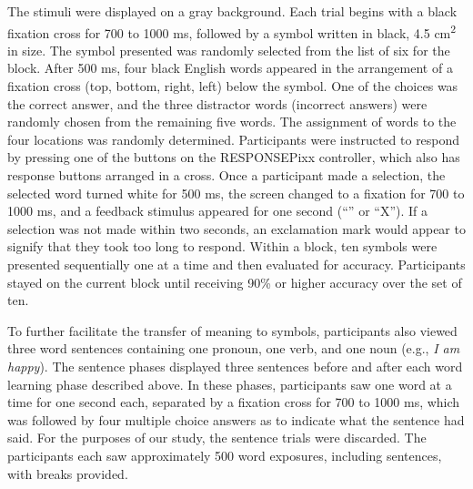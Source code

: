 The stimuli were displayed on a gray background.  Each trial begins with a black fixation cross for 700 to 1000 ms, followed by a symbol written in black, 4.5 cm\textsuperscript{2} in size. The symbol presented was randomly selected from the list of six for the block. After 500 ms, four black English words appeared in the arrangement of a fixation cross (top, bottom, right, left) below the symbol. One of the choices was the correct answer, and the three distractor words (incorrect answers) were randomly chosen from the remaining five words. The assignment of words to the four locations was randomly determined. Participants were instructed to respond by pressing one of the buttons on the RESPONSEPixx controller, which also has response buttons arranged in a cross. Once a participant made a selection, the selected word turned white for 500 ms, the screen changed to a fixation for 700 to 1000 ms, and a feedback stimulus appeared for one second (``\CheckmarkBold'' or ``X''). If a selection was not made within two seconds, an exclamation mark would appear to signify that they took too long to respond. Within a block, ten symbols were presented sequentially one at a time and then evaluated for accuracy. Participants stayed on the current block until receiving 90\% or higher accuracy over the set of ten.
  
To further facilitate the transfer of meaning to symbols, participants also viewed three word sentences containing one pronoun, one verb, and one noun (e.g., \emph{I am happy}). The sentence phases displayed three sentences before and after each word learning phase described above. In these phases, participants saw one word at a time for one second each, separated by a fixation cross for 700 to 1000 ms, which was followed by four multiple choice answers as to indicate what the sentence had said. For the purposes of our study, the sentence trials were discarded. The participants each saw approximately 500 word exposures, including sentences, with breaks provided.
